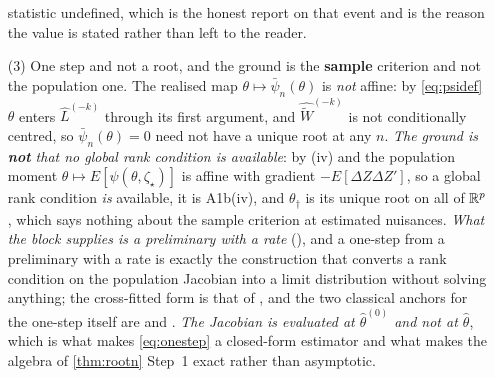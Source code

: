 \begin{remark}
\begin{enumerate}
statistic undefined, which is the honest report on that event and is the reason the value is stated rather
than left to the reader.
\item[(3)] One step and not a root, and the ground is the \textbf{sample} criterion and not the
population one. The realised map
$\theta\mapsto\bar\psi_n(\theta)$ is \emph{not} affine: by \eqref{eq:psidef} $\theta$ enters
$\hat L^{(-k)}$ through its first argument, and $\widehat{\widetilde W}^{(-k)}$ is not conditionally
centred, so $\bar\psi_n(\theta)=0$ need not have a unique root at any $n$. \emph{The ground is
\textbf{not} that no global rank condition is available}: by \textup{(iv)} and
 the
population moment $\theta\mapsto E[\psi(\theta,\zeta_\star)]$ is affine with gradient $-E[\Delta Z\Delta Z']$,
so a global rank condition \emph{is} available, it is A1b(iv), and $\theta_\dagger$ is its unique root on
all of $\mathbb{R}^{p}$, which says nothing about the sample criterion at estimated nuisances.
\emph{What the block supplies is a preliminary with a
rate} (), and a one-step from a preliminary with a rate is exactly the construction
that converts a rank condition on the population Jacobian into a limit distribution without solving
anything; the cross-fitted form is that of
\citet{chernozhukov2018dml}, and the two classical anchors for the one-step itself are
\citet[\S3.4]{newey1994h} and \citet[Ch.~5]{vandervaart1998}. \emph{The Jacobian is
evaluated at $\hat\theta^{(0)}$ and not at $\hat\theta$}, which is what makes \eqref{eq:onestep} a closed-form
estimator and what makes the algebra of \cref{thm:rootn} Step~1 exact rather than asymptotic.
\end{enumerate}
\end{remark}
